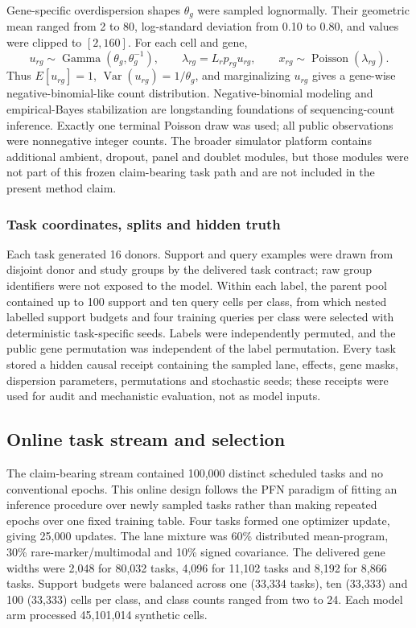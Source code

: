 \documentclass[12pt]{article}
\begin{document}
Gene-specific overdispersion shapes $\theta_g$ were sampled lognormally. Their geometric mean ranged from 2 to 80, log-standard deviation from 0.10 to 0.80, and values were clipped to $[2,160]$. For each cell and gene,
\begin{equation}
u_{rg}\sim\operatorname{Gamma}(\theta_g,\theta_g^{-1}),\qquad
\lambda_{rg}=L_rp_{rg}u_{rg},\qquad
x_{rg}\sim\operatorname{Poisson}(\lambda_{rg}).
\end{equation}
Thus $E[u_{rg}]=1$, $\operatorname{Var}(u_{rg})=1/\theta_g$, and marginalizing $u_{rg}$ gives a gene-wise negative-binomial-like count distribution. Negative-binomial modeling and empirical-Bayes stabilization are longstanding foundations of sequencing-count inference\cite{robinson2010edger}. Exactly one terminal Poisson draw was used; all public observations were nonnegative integer counts. The broader simulator platform contains additional ambient, dropout, panel and doublet modules, but those modules were not part of this frozen claim-bearing task path and are not included in the present method claim.

\subsubsection*{Task coordinates, splits and hidden truth}

Each task generated 16 donors. Support and query examples were drawn from disjoint donor and study groups by the delivered task contract; raw group identifiers were not exposed to the model. Within each label, the parent pool contained up to 100 support and ten query cells per class, from which nested labelled support budgets and four training queries per class were selected with deterministic task-specific seeds. Labels were independently permuted, and the public gene permutation was independent of the label permutation. Every task stored a hidden causal receipt containing the sampled lane, effects, gene masks, dispersion parameters, permutations and stochastic seeds; these receipts were used for audit and mechanistic evaluation, not as model inputs.

\subsection*{Online task stream and selection}

The claim-bearing stream contained 100,000 distinct scheduled tasks and no conventional epochs. This online design follows the PFN paradigm of fitting an inference procedure over newly sampled tasks rather than making repeated epochs over one fixed training table\cite{muller2022pfn,hollmann2025tabpfn,qu2026tabiclv2}. Four tasks formed one optimizer update, giving 25,000 updates. The lane mixture was 60\% distributed mean-program, 30\% rare-marker/multimodal and 10\% signed covariance. The delivered gene widths were 2,048 for 80,032 tasks, 4,096 for 11,102 tasks and 8,192 for 8,866 tasks. Support budgets were balanced across one (33,334 tasks), ten (33,333) and 100 (33,333) cells per class, and class counts ranged from two to 24. Each model arm processed 45,101,014 synthetic cells.
\end{document}

